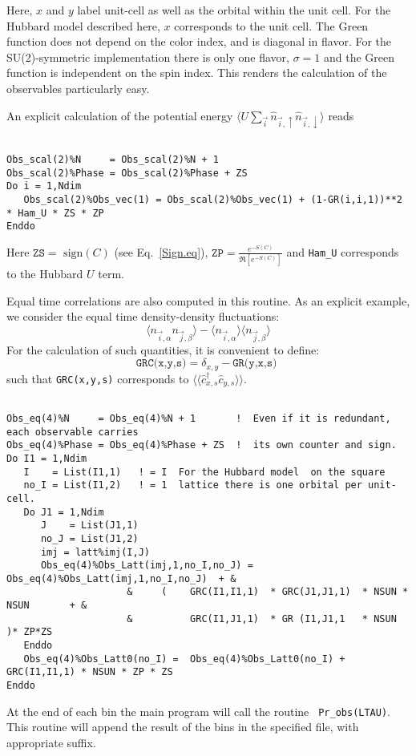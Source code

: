 Here,   $x$ and $y$ label  unit-cell as well as the orbital within the unit cell. For the Hubbard model described here, $x$ corresponds to the unit cell.  The Green function  does not depend on the color index, and is diagonal in flavor.  For the SU(2)-symmetric implementation  there is only one flavor, $\sigma = 1$ and the Green function is  independent on the spin index.  This renders the calculation of the observables particularly easy.   

An explicit calculation of the   potential energy  $ \langle U \sum_{\vec{i}}  \hat{n}_{\vec{i},\uparrow}   \hat{n}_{\vec{i},\downarrow}  \rangle $ reads 

\begin{lstlisting} 

Obs_scal(2)%N     = Obs_scal(2)%N + 1
Obs_scal(2)%Phase = Obs_scal(2)%Phase + ZS
Do i = 1,Ndim
   Obs_scal(2)%Obs_vec(1) = Obs_scal(2)%Obs_vec(1) + (1-GR(i,i,1))**2 * Ham_U * ZS * ZP
Enddo

\end{lstlisting} 
Here  $ \texttt{ZS} = \text{ sign} (C) $  (see Eq.~\ref{Sign.eq}),  $ \texttt{ZP} =   \frac{e^{-S(C)}} {\Re \left[e^{-S(C)} \right]}   $ and  \texttt{Ham\_U}  corresponds to the Hubbard $U$ term.


Equal time correlations  are also computed in this routine. As an explicit example, we  consider the equal time density-density   fluctuations:
\begin{equation}
	 \langle n_{\vec{i},\alpha}   n_{\vec{j},\beta} \rangle   -  \langle n_{\vec{i},\alpha} \rangle  \langle    n_{\vec{j},\beta}  \rangle 
\end{equation} 
For the calculation of such quantities, it is convenient to  define: 
\begin{equation}
\label{GRC.eq}
	\texttt{GRC(x,y,s)}   =  \delta_{x,y}  - \texttt{GR(y,x,s)  }
\end{equation}
such that \texttt{GRC(x,y,s)}    corresponds to  $ \langle \langle  \hat{c}_{x,s}^{\dagger}\hat{c}_{y,s}^{\phantom\dagger} \rangle \rangle $.  
\begin{lstlisting} 

Obs_eq(4)%N     = Obs_eq(4)%N + 1       !  Even if it is redundant, each observable carries 
Obs_eq(4)%Phase = Obs_eq(4)%Phase + ZS  !  its own counter and sign.
Do I1 = 1,Ndim
   I    = List(I1,1)   ! = I  For the Hubbard model  on the square
   no_I = List(I1,2)   ! = 1  lattice there is one orbital per unit-cell. 
   Do J1 = 1,Ndim
      J    = List(J1,1)
      no_J = List(J1,2)
      imj = latt%imj(I,J)
      Obs_eq(4)%Obs_Latt(imj,1,no_I,no_J) =  Obs_eq(4)%Obs_Latt(imj,1,no_I,no_J)  + &
                     &     (    GRC(I1,I1,1)  * GRC(J1,J1,1)  * NSUN * NSUN       + &
                     &          GRC(I1,J1,1)  * GR (I1,J1,1   * NSUN              )* ZP*ZS  
   Enddo
   Obs_eq(4)%Obs_Latt0(no_I) =  Obs_eq(4)%Obs_Latt0(no_I) +   GRC(I1,I1,1) * NSUN * ZP * ZS
Enddo

\end{lstlisting} 
At the end of each bin  the main program will call the routine \texttt{ Pr\_obs(LTAU)}. This routine will append the result of the bins in the specified file,  with appropriate suffix. 


